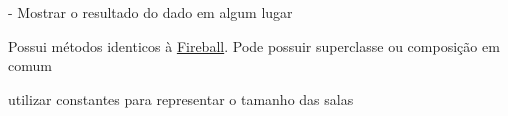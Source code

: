 \begin{DoxyRefList}
%
-\/ Mostrar o resultado do dado em algum lugar  
\item[Classe \mbox{\hyperlink{classbr_1_1unicamp_1_1mc322_1_1projeto_1_1heroquest_1_1magic_1_1_magic_missile}{br.unicamp.mc322.projeto.heroquest.magic.Magic\+Missile}} ]\label{todo__todo000059}%
%
Possui métodos identicos à \mbox{\hyperlink{classbr_1_1unicamp_1_1mc322_1_1projeto_1_1heroquest_1_1magic_1_1_fireball}{Fireball}}. Pode possuir superclasse ou composição em comum  
\item[Membro \mbox{\hyperlink{classbr_1_1unicamp_1_1mc322_1_1projeto_1_1heroquest_1_1service_1_1_hero_quest_stage_creator_service_a7e0dcc69b4185bd527664d92d8a510ac}{br.unicamp.mc322.projeto.heroquest.service.Hero\+Quest\+Stage\+Creator\+Service.build\+The\+Wall}} (Stage\+Prototype stage)]\label{todo__todo000060}%
%
utilizar constantes para representar o tamanho das salas 
\end{DoxyRefList}
